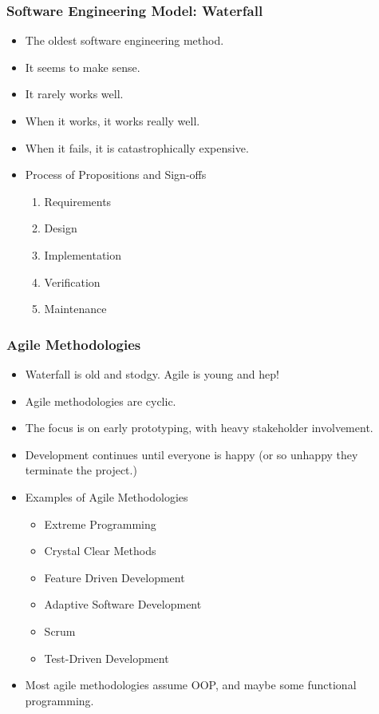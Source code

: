 \documentclass{beamer}
\begin{document}
\begin{frame}
    \frametitle{Software Engineering Model: Waterfall}
    \begin{itemize}[<+->]
        \item The oldest software engineering method.
        \item It seems to make sense.
        \item It rarely works well.
        \item When it works, it works really well.
        \item When it fails, it is catastrophically expensive.
        \item Process of Propositions and Sign-offs
        \begin{enumerate}[<+->]
            \item Requirements
            \item Design 
            \item Implementation
            \item Verification
            \item Maintenance
        \end{enumerate}
    \end{itemize}
\end{frame}

\begin{frame}
    \frametitle{Agile Methodologies}
    \begin{itemize}[<+->]
        \item Waterfall is old and stodgy.  Agile is young and hep!
        \item Agile methodologies are cyclic.
        \item The focus is on early prototyping, with heavy stakeholder involvement.
        \item Development continues until everyone is happy (or so unhappy they
           terminate the project.)
        \item Examples of Agile Methodologies
        \begin{itemize}[<+->]
            \item Extreme Programming
            \item Crystal Clear Methods
            \item Feature Driven Development
            \item Adaptive Software Development
            \item Scrum
            \item Test-Driven Development
        \end{itemize}
        \item Most agile methodologies assume OOP, and maybe some functional
           programming.
    \end{itemize}
\end{frame}
\end{document}
